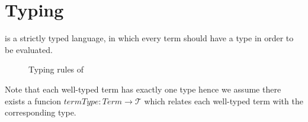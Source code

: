 \section{Typing}
\label{sec:typing}

\langname is a strictly typed language, in which every term should have a type in order to be evaluated.

\begin{figure}[h]
\footnotesize

\caption{Typing rules of \langname}
\label{fig:typing}
\end{figure}

Note that each well-typed term has exactly one type hence we assume there
exists a funcion $termType: Term \to \mathcal{T}$ which relates each well-typed
term with the corresponding type.